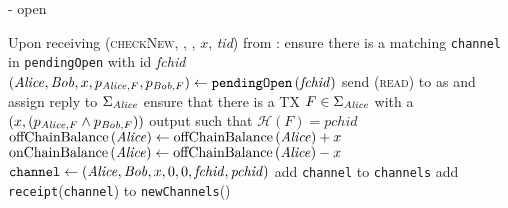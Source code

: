 \begin{systembox}{\fpaynet - open}
\begin{algorithmic}[1]
    \State Upon receiving (\textsc{checkNew}, \alice, \bob, $x$, \textit{tid})
    from \alice:
    \Indent
      \State ensure there is a matching \texttt{channel} in \texttt{pendingOpen}
      with id \textit{fchid}
      \State $\left(\mathit{Alice}, \mathit{Bob}, x, p_{\mathit{Alice}, F}, p_{\mathit{Bob}, F}\right) \gets
      \mathtt{pendingOpen}\left(\mathit{fchid}\right)$
      \State send (\textsc{read}) to \ledger{} as \alice{} and assign reply to
      $\Sigma_{\mathit{Alice}}$
      \State ensure that there is a TX $F \in \Sigma_{\mathit{Alice}}$ with a $\left(x,
      \left(p_{\mathit{Alice}, F} \wedge p_{\mathit{Bob}, F}\right)\right)$ output such that
      $\mathcal{H}\left(F\right) = \mathit{pchid}$
      \State $\mathrm{offChainBalance}\left(\mathit{Alice}\right) \gets
      \mathrm{offChainBalance}\left(\mathit{Alice}\right) + x$ 
      \State $\mathrm{onChainBalance}\left(\mathit{Alice}\right) \gets
      \mathrm{offChainBalance}\left(\mathit{Alice}\right) - x$
      \State $\mathtt{channel} \gets \left(\mathit{Alice}, \mathit{Bob}, x, 0, 0,
      \mathit{fchid}, \mathit{pchid}\right)$
      \State add \texttt{channel} to \texttt{channels}
      \State add \texttt{receipt}(\texttt{channel}) to
      \texttt{newChannels}(\alice)
    \EndIndent
    \State
  \end{algorithmic}
\end{systembox}

